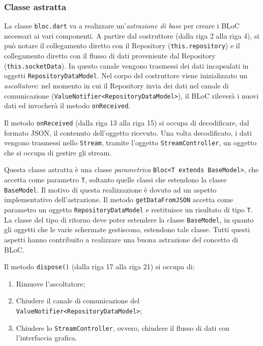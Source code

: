\subsubsection{Classe astratta}
La classe \verb|bloc.dart| va a realizzare un'\textit{astrazione di base} per creare i BLoC necessari ai vari componenti. A partire dal costruttore (dalla riga 2 alla riga 4), si può notare il collegamento diretto con il Repository (\verb|this.repository|) e il collegamento diretto con il flusso di dati proveniente dal Repository\\ (\verb|this.socketData|). In questo canale vengono trasmessi dei dati incapsulati in oggetti \verb|RepositoryDataModel|. Nel corpo del costruttore viene inizializzato un \textit{ascoltatore}: nel momento in cui il Repository invia dei dati nel canale di comunicazione (\verb|ValueNotifier<RepositoryDataModel>|), il BLoC rileverà i nuovi dati ed invocherà il metodo \verb|onReceived|.

Il metodo \verb|onReceived| (dalla riga 13 alla riga 15) si occupa di decodificare, dal formato JSON, il contenuto dell'oggetto ricevuto. Una volta decodificato, i dati vengono trasmessi nello \verb|Stream|, tramite l'oggetto \verb|StreamController|, un oggetto che si occupa di gestire gli stream.

Questa classe astratta è una classe \textit{parametrica} \verb|Bloc<T extends BaseModel>|, che accetta come parametro \verb|T|, soltanto quelle classi che estendono la classe \verb|BaseModel|. Il motivo di questa realizzazione è dovuto ad un aspetto implementativo dell'astrazione. Il metodo \verb|getDataFromJSON| accetta come parametro un oggetto \verb|RepositoryDataModel| e restituisce un risultato di tipo \verb|T|. La classe del tipo di ritorno deve poter estendere la classe \verb|BaseModel|, in quanto gli oggetti che le varie schermate gestiscono, estendono tale classe. Tutti questi aspetti hanno contribuito a realizzare una buona astrazione del concetto di BLoC.

Il metodo \verb|dispose()| (dalla riga 17 alla riga 21) si occupa di:
\begin{enumerate}
	\item Rimuove l'ascoltatore;
	\item Chiudere il canale di comunicazione del\\ \verb|ValueNotifier<RepositoryDataModel>|;
	\item Chiudere lo \verb|StreamController|, ovvero, chiudere il flusso di dati con l'interfaccia grafica.
\end{enumerate}

